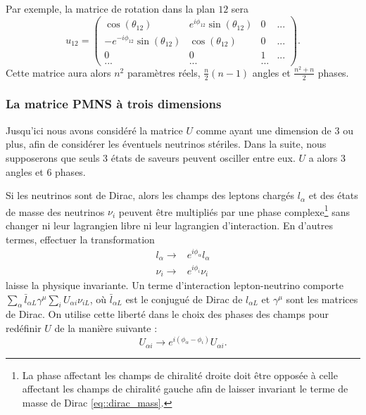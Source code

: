         Par exemple, la matrice de rotation dans la plan $12$ sera
        \begin{equation}
          u_{12} = 
          \left(\begin{matrix}
            \cos(\theta_{12}) & e^{i\phi_{12}}\sin(\theta_{12}) & 0 & ... \\
            -e^{-i\phi_{12}}\sin(\theta_{12}) & \cos(\theta_{12}) & 0 & ... \\
            0 & 0 & 1 & ... \\
            ... & ... & ... &
          \end{matrix}\right).
        \end{equation}
        Cette matrice aura alors $n^2$ paramètres réels, $\frac{n}{2}(n-1)$ angles  et $\frac{n^2+n}{2}$ phases.

      \subsubsection{La matrice PMNS à trois dimensions}
        Jusqu'ici nous avons considéré la matrice $U$ comme ayant une dimension de 3 ou plus, afin de considérer les éventuels neutrinos stériles. Dans la suite, nous supposerons que seuls 3 états de saveurs peuvent osciller entre eux. $U$ a alors 3 angles et 6 phases.
        
        Si les neutrinos sont de Dirac, alors les champs des leptons chargés $l_{\alpha}$ et des états de masse des neutrinos $\nu_i$ peuvent être multipliés par une phase complexe\footnote{La phase affectant les champs de chiralité droite doit être opposée à celle affectant les champs de chiralité gauche afin de laisser invariant le terme de masse de Dirac \eqref{eq::dirac_mass}.} sans changer ni leur lagrangien libre ni leur lagrangien d'interaction. En d'autres termes, effectuer la transformation 
        \begin{eqnarray}
          l_{\alpha}\to & e^{i\phi_{\alpha}}l_{\alpha} \\
          \nu_i\to & e^{i\phi_i}\nu_i 
        \end{eqnarray}
        laisse la physique invariante. Un terme d'interaction lepton-neutrino comporte $\sum_{\alpha}\bar{l}_{\alpha L}\gamma^{\mu}\sum_i U_{\alpha i}\nu_{i L}$, où $\bar{l}_{\alpha L}$ est le conjugué de Dirac de $l_{\alpha L}$ et $\gamma^{\mu}$ sont les matrices de Dirac. On utilise cette liberté dans le choix des phases des champs pour redéfinir $U$ de la manière suivante :
        \begin{equation}
          U_{\alpha i}\to e^{i(\phi_{\alpha}-\phi_i)}U_{\alpha i}.
        \end{equation}
        

